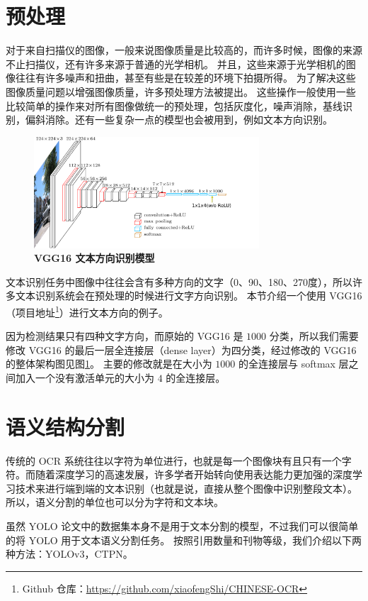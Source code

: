\section{预处理}
对于来自扫描仪的图像，一般来说图像质量是比较高的，而许多时候，图像的来源不止扫描仪，还有许多来源于普通的光学相机。
并且，这些来源于光学相机的图像往往有许多噪声和扭曲，甚至有些是在较差的环境下拍摄所得。
为了解决这些图像质量问题以增强图像质量，许多预处理方法被提出。
这些操作一般使用一些比较简单的操作来对所有图像做统一的预处理，包括灰度化，噪声消除，基线识别，偏斜消除。还有一些复杂一点的模型也会被用到，例如文本方向识别。

\begin{figure}[h!]
	\centering
	\includegraphics[width=0.75\textwidth]{figure/resources/vgg16_text_angle.png}
	\caption{\textbf{VGG16 文本方向识别模型}\label{vgg16_text_angle}}
\end{figure}

文本识别任务中图像中往往会含有多种方向的文字（0、90、180、270度），所以许多文本识别系统会在预处理的时候进行文字方向识别。
本节介绍一个使用 VGG16\cite{vgg} （项目地址\footnote{Github 仓库：\url{https://github.com/xiaofengShi/CHINESE-OCR}}）进行文本方向的例子。

因为检测结果只有四种文字方向，而原始的 VGG16 是 $1000$ 分类，所以我们需要修改 VGG16 的最后一层全连接层（dense layer）为四分类，经过修改的 VGG16 的整体架构图见图\ref{vgg16_text_angle}。
主要的修改就是在大小为 $1000$ 的全连接层与 softmax 层之间加入一个没有激活单元的大小为 $4$ 的全连接层。

\section{语义结构分割}
传统的 OCR 系统往往以字符为单位进行，也就是每一个图像块有且只有一个字符。而随着深度学习的高速发展，许多学者开始转向使用表达能力更加强的深度学习技术来进行端到端的文本识别（也就是说，直接从整个图像中识别整段文本）。
所以，语义分割的单位也可以分为字符和文本块。

虽然 YOLO 论文中的数据集本身不是用于文本分割的模型，不过我们可以很简单的将 YOLO 用于文本语义分割任务。
按照引用数量和刊物等级，我们介绍以下两种方法：YOLOv3\cite{yolov3}，CTPN\cite{CTPN}。

